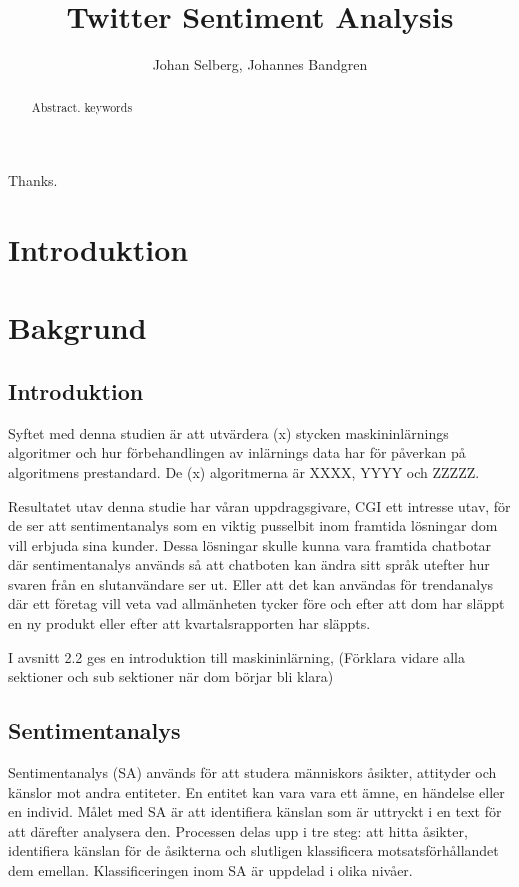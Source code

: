 \documentclass{kaumasters} %
\title{Twitter Sentiment Analysis}
\author{Johan Selberg, Johannes Bandgren}
\institute{Department of Computer Science}
\begin{document}
\maketitle



\frontmatter
\begin{abstract}
  Abstract.
  \keywords keywords
\end{abstract}
\approvalpage%
\begin{acknowledgements}
  Thanks.
\end{acknowledgements}

\tableofcontents{}
\mainmatter


\chapter{Introduktion}

\newpage


\chapter{Bakgrund}
\section{Introduktion}
Syftet med denna studien är att utvärdera (x) stycken maskininlärnings algoritmer och hur förbehandlingen av inlärnings data har för påverkan på algoritmens prestandard. De (x) algoritmerna är XXXX, YYYY och ZZZZZ. 

Resultatet utav denna studie har våran uppdragsgivare, CGI ett intresse utav, för de ser att sentimentanalys som en viktig pusselbit inom framtida lösningar dom vill erbjuda sina kunder. Dessa lösningar skulle kunna vara framtida chatbotar där sentimentanalys används så att chatboten kan ändra sitt språk utefter hur svaren från en slutanvändare ser ut. Eller att det kan användas för trendanalys där ett företag vill veta vad allmänheten tycker före och efter att dom har släppt en ny produkt eller efter att kvartalsrapporten har släppts. 


I avsnitt 2.2 ges en introduktion till maskininlärning, (Förklara vidare alla sektioner och sub sektioner när dom börjar bli klara)

\section{Sentimentanalys}
Sentimentanalys (SA) används för att studera människors åsikter, attityder och känslor mot andra entiteter. En entitet kan vara vara ett ämne,  en händelse eller en individ. Målet med SA är att identifiera känslan som är uttryckt i en text för att därefter analysera den. Processen delas upp i tre steg: att hitta åsikter, identifiera känslan för de åsikterna och slutligen klassificera motsatsförhållandet dem emellan. Klassificeringen inom SA är uppdelad i olika nivåer. 
\end{document}
